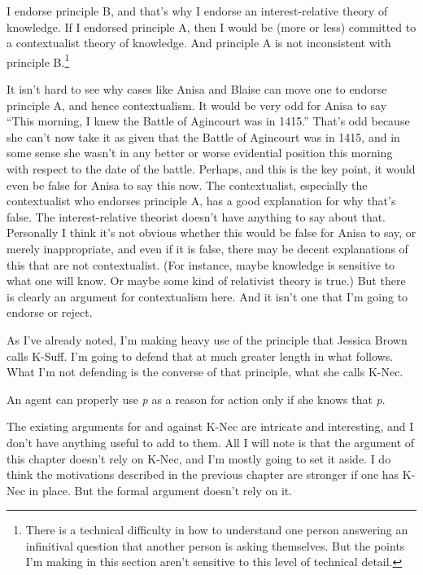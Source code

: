 \documentclass[
  11pt,
]{book}
\providecommand{\tightlist}{%
  \setlength{\itemsep}{0pt}\setlength{\parskip}{0pt}}
\begin{document}
I endorse principle B, and that's why I endorse an interest-relative theory of knowledge. If I endorsed principle A, then I would be (more or less) committed to a contextualist theory of knowledge. And principle A is not inconsistent with principle B.\footnote{There is a technical difficulty in how to understand one person answering an infinitival question that another person is asking themselves. But the points I'm making in this section aren't sensitive to this level of technical detail.}

It isn't hard to see why cases like Anisa and Blaise can move one to endorse principle A, and hence contextualism. It would be very odd for Anisa to say ``This morning, I knew the Battle of Agincourt was in 1415.'' That's odd because she can't now take it as given that the Battle of Agincourt was in 1415, and in some sense she wasn't in any better or worse evidential position this morning with respect to the date of the battle. Perhaps, and this is the key point, it would even be false for Anisa to say this now. The contextualist, especially the contextualist who endorses principle A, has a good explanation for why that's false. The interest-relative theorist doesn't have anything to say about that. Personally I think it's not obvious whether this would be false for Anisa to say, or merely inappropriate, and even if it is false, there may be decent explanations of this that are not contextualist. (For instance, maybe knowledge is sensitive to what one will know. Or maybe some kind of relativist theory is true.) But there is clearly an argument for contextualism here. And it isn't one that I'm going to endorse or reject.

As I've already noted, I'm making heavy use of the principle that Jessica Brown calls K-Suff. I'm going to defend that at much greater length in what follows. What I'm not defending is the converse of that principle, what she calls K-Nec.

\begin{description}
\tightlist
\item[K-Nec]
An agent can properly use \emph{p} as a reason for action only if she knows that \emph{p}.
\end{description}

The existing arguments for and against K-Nec are intricate and interesting, and I don't have anything useful to add to them. All I will note is that the argument of this chapter doesn't rely on K-Nec, and I'm mostly going to set it aside. I do think the motivations described in the previous chapter are stronger if one has K-Nec in place. But the formal argument doesn't rely on it.
\end{document}
